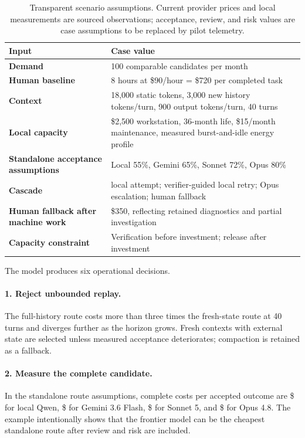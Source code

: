 \documentclass[11pt]{article}
\begin{document}
\begin{table}[htbp]
\centering
\small
\begin{tabularx}{\textwidth}{>{\bfseries}p{} X}
\toprule
Input & Case value \\
\midrule
Demand & 100 comparable candidates per month \\
Human baseline & 8 hours at \$90/hour = \$720 per completed task \\
Context & 18,000 static tokens, 3,000 new history tokens/turn, 900 output tokens/turn, 40 turns \\
Local capacity & \$2,500 workstation, 36-month life, \$15/month maintenance, measured burst-and-idle energy profile \\
Standalone acceptance assumptions & Local 55\%, Gemini 65\%, Sonnet 72\%, Opus 80\% \\
Cascade & local attempt; verifier-guided local retry; Opus escalation; human fallback \\
Human fallback after machine work & \$350, reflecting retained diagnostics and partial investigation \\
Capacity constraint & Verification before investment; release after investment \\
\bottomrule
\end{tabularx}
\caption{Transparent scenario assumptions. Current provider prices and local measurements are sourced observations; acceptance, review, and risk values are case assumptions to be replaced by pilot telemetry.}
\label{tab:case}
\end{table}

The model produces six operational decisions.

\paragraph{1. Reject unbounded replay.}
The full-history route costs more than three times the fresh-state route at 40 turns and diverges further as the horizon grows. Fresh contexts with external state are selected unless measured acceptance deteriorates; compaction is retained as a fallback.

\paragraph{2. Measure the complete candidate.}
In the standalone route assumptions, complete costs per accepted outcome are \$\LocalAcceptedCost{} for local Qwen, \$\GeminiAcceptedCost{} for Gemini 3.6 Flash, \$\SonnetAcceptedCost{} for Sonnet 5, and \$\OpusAcceptedCost{} for Opus 4.8. The example intentionally shows that the frontier model can be the cheapest standalone route after review and risk are included.
\end{document}
